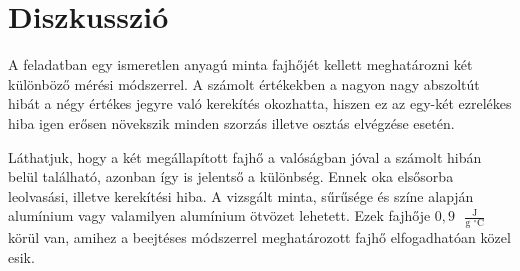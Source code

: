 \documentclass[a4paper, 12pt, oneside]{article}
\begin{document}
\section*{Diszkusszió}
    A feladatban egy ismeretlen anyagú minta fajhőjét kellett meghatározni két különböző mérési módszerrel. A számolt értékekben a nagyon nagy abszoltút hibát a négy értékes jegyre való kerekítés okozhatta, hiszen ez az egy-két ezrelékes hiba igen erősen növekszik minden szorzás illetve osztás elvégzése esetén.
    
    \noindent Láthatjuk, hogy a két megállapított fajhő a valóságban jóval a számolt hibán belül található, azonban így is jelentső a különbség. Ennek oka elsősorba leolvasási, illetve kerekítési hiba. A vizsgált minta, sűrűsége és színe alapján alumínium vagy valamilyen alumínium ötvözet lehetett. Ezek fajhője $0,9\textrm{ }\frac{\textrm{J}}{\textrm{g $^\circ$C}}$ körül van, amihez a beejtéses módszerrel meghatározott fajhő elfogadhatóan közel esik.
\end{document}
